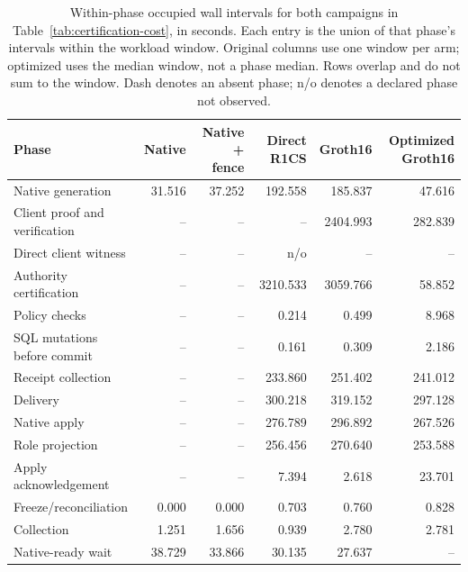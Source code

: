 \begin{table}[t]
\centering
\caption{Within-phase occupied wall intervals for both campaigns in Table~\ref{tab:certification-cost},
in seconds. Each entry is the union of that phase's intervals within the
workload window. Original columns use one window per arm; optimized uses
the median window, not a phase median. Rows overlap and do not sum to the window.
Dash denotes an absent phase; n/o denotes a declared phase not observed.}
\label{tab:closure-stage-costs}
\footnotesize
\begin{tabularx}{\textwidth}{@{}Yrrrrr@{}}
\toprule
Phase & Native & Native + fence & Direct R1CS & Groth16 & Optimized Groth16 \\
\midrule
Native generation & 31.516 & 37.252 & 192.558 & 185.837 & 47.616 \\
Client proof and verification & -- & -- & -- & 2404.993 & 282.839 \\
Direct client witness & -- & -- & n/o & -- & -- \\
Authority certification & -- & -- & 3210.533 & 3059.766 & 58.852 \\
Policy checks & -- & -- & 0.214 & 0.499 & 8.968 \\
SQL mutations before commit & -- & -- & 0.161 & 0.309 & 2.186 \\
Receipt collection & -- & -- & 233.860 & 251.402 & 241.012 \\
Delivery & -- & -- & 300.218 & 319.152 & 297.128 \\
Native apply & -- & -- & 276.789 & 296.892 & 267.526 \\
Role projection & -- & -- & 256.456 & 270.640 & 253.588 \\
Apply acknowledgement & -- & -- & 7.394 & 2.618 & 23.701 \\
Freeze/reconciliation & 0.000 & 0.000 & 0.703 & 0.760 & 0.828 \\
Collection & 1.251 & 1.656 & 0.939 & 2.780 & 2.781 \\
Native-ready wait & 38.729 & 33.866 & 30.135 & 27.637 & -- \\
\bottomrule
\end{tabularx}
\end{table}
